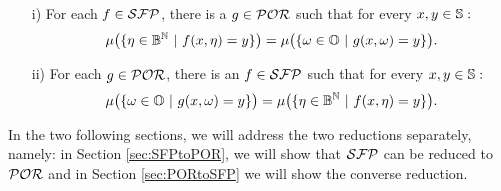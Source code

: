 \begin{theorem}\label{thmTaskC}
\begin{itemize}

\item[i)] For each $f \in \mathcal{SFP}$, there is a $g \in \mathcal{POR}$ such that for every $x,y\in \mathbb{S}:$
$$
\mu\big(\{\eta \in \Bool^\Nat \ | \  f(x,\eta) = y\}\big) = \mu\big(\{\omega \in \Os \ | \ g(x,\omega)=y\}\big).
$$

\item[ii)] For each $g\in \mathcal{POR}$, there is an  $f \in \mathcal{SFP}$ such that for every $x,y\in \mathbb{S}:$
$$
\mu\big(\{\omega \in \mathbb{O} \ | \ g(x,\omega) = y\}\big) = \mu\big(\{\eta \in \mathbb{B}^{\mathbb{N}} \ | \  f(x, \eta) = y\}\big).
$$
\end{itemize}
\end{theorem}

In the two following sections, we will address the two reductions
separately, namely: in Section \ref{sec:SFPtoPOR}, we will show
that $\mathcal{SFP}$ can be reduced to $\mathcal{POR}$ and in Section
 \ref{sec:PORtoSFP} we will show the converse reduction.

